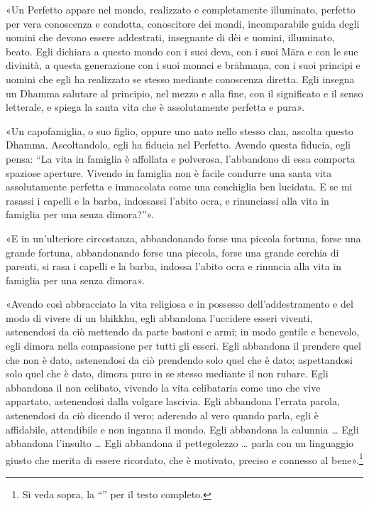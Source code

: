 «Un Perfetto appare nel mondo, realizzato e completamente illuminato, perfetto
per vera conoscenza e condotta, conoscitore dei mondi, incomparabile guida degli
uomini che devono essere addestrati, insegnante di dèi e uomini, illuminato,
beato. Egli dichiara a questo mondo con i suoi deva, con i suoi Māra e con le
sue divinità, a questa generazione con i suoi monaci e brāhmaṇa, con i suoi
principi e uomini che egli ha realizzato se stesso mediante conoscenza diretta.
Egli insegna un Dhamma salutare al principio, nel mezzo e alla fine, con il
significato e il senso letterale, e spiega la santa vita che è assolutamente
perfetta e pura».

«Un capofamiglia, o suo figlio, oppure uno nato nello stesso clan, ascolta
questo Dhamma. Ascoltandolo, egli ha fiducia nel Perfetto. Avendo questa
fiducia, egli pensa: “La vita in famiglia è affollata e polverosa, l’abbandono
di essa comporta spaziose aperture. Vivendo in famiglia non è facile condurre
una santa vita assolutamente perfetta e immacolata come una conchiglia ben
lucidata. E se mi rasassi i capelli e la barba, indossassi l’abito ocra, e
rinunciassi alla vita in famiglia per una senza dimora?”».

«E in un’ulteriore circostanza, abbandonando forse una piccola fortuna, forse
una grande fortuna, abbandonando forse una piccola, forse una grande cerchia di
parenti, si rasa i capelli e la barba, indossa l’abito ocra e rinuncia alla vita
in famiglia per una senza dimora».

«Avendo così abbracciato la vita religiosa e in possesso dell’addestramento e
del modo di vivere di un bhikkhu, egli abbandona l’uccidere esseri viventi,
astenendosi da ciò mettendo da parte bastoni e armi; in modo gentile e benevolo,
egli dimora nella compassione per tutti gli esseri. Egli abbandona il prendere
quel che non è dato, astenendosi da ciò prendendo solo quel che è dato;
aspettandosi solo quel che è dato, dimora puro in se stesso mediante il non
rubare. Egli abbandona il non celibato, vivendo la vita celibataria come uno che
vive appartato, astenendosi dalla volgare lascivia. Egli abbandona l’errata
parola, astenendosi da ciò dicendo il vero; aderendo al vero quando parla, egli
è affidabile, attendibile e non inganna il mondo. Egli abbandona la calunnia …
Egli abbandona l’insulto … Egli abbandona il pettegolezzo … parla con un
linguaggio giusto che merita di essere ricordato, che è motivato, preciso e
connesso al bene».\footnote{Si veda sopra, la “\hyperlink{pag265}{}” per il
  testo completo.}

